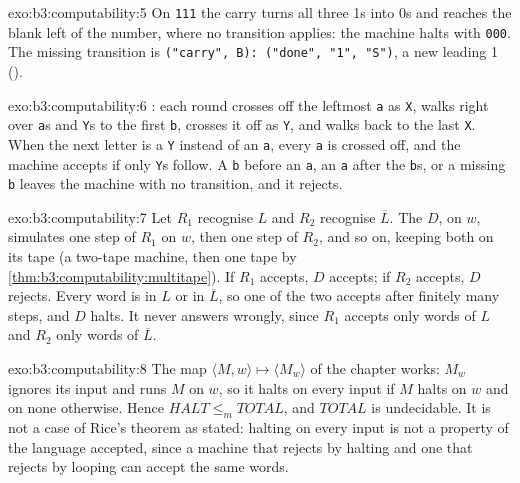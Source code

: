 \begin{solution}{exo:b3:computability:5}
On \texttt{111} the carry turns all three 1s into 0s and reaches the blank left of the number, where no transition applies: the machine halts with \texttt{000}. The missing transition is \texttt{("carry", B):\ ("done", "1", "S")}, a new leading 1 ().
\end{solution}

\begin{solution}{exo:b3:computability:6}
: each round crosses off the leftmost \texttt{a} as \texttt{X}, walks right over \texttt{a}s and \texttt{Y}s to the first \texttt{b}, crosses it off as \texttt{Y}, and walks back to the last \texttt{X}. When the next letter is a \texttt{Y} instead of an \texttt{a}, every \texttt{a} is crossed off, and the machine accepts if only \texttt{Y}s follow. A \texttt{b} before an \texttt{a}, an \texttt{a} after the \texttt{b}s, or a missing \texttt{b} leaves the machine with no transition, and it rejects.
\end{solution}

\begin{solution}{exo:b3:computability:7}
Let $R_1$ recognise $L$ and $R_2$ recognise $\overline{L}$. The  $D$, on $w$, simulates one step of $R_1$ on $w$, then one step of $R_2$, and so on, keeping both  on its tape (a two-tape machine, then one tape by \cref{thm:b3:computability:multitape}). If $R_1$ accepts, $D$ accepts; if $R_2$ accepts, $D$ rejects. Every word is in $L$ or in $\overline{L}$, so one of the two accepts after finitely many steps, and $D$ halts. It never answers wrongly, since $R_1$ accepts only words of $L$ and $R_2$ only words of $\overline{L}$.
\end{solution}

\begin{solution}{exo:b3:computability:8}
The map $\langle M, w \rangle \mapsto \langle M_w \rangle$ of the chapter works: $M_w$ ignores its input and runs $M$ on $w$, so it halts on every input if $M$ halts on $w$ and on none otherwise. Hence $\mathit{HALT} \le_m \mathit{TOTAL}$, and $\mathit{TOTAL}$ is undecidable. It is not a case of Rice's theorem as stated: halting on every input is not a property of the language accepted, since a machine that rejects by halting and one that rejects by looping can accept the same words.
\end{solution}


